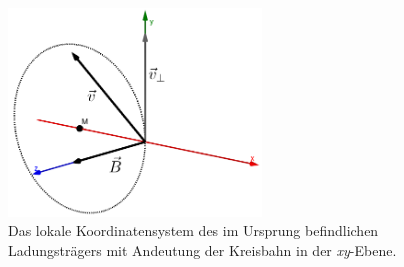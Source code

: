 \begin{figure}
  \centering
  \includegraphics[width=0.6\textwidth]{geogebra/img/local_movement_edited}
  \caption{Das lokale Koordinatensystem des im Ursprung befindlichen Ladungstr\"agers mit Andeutung der Kreisbahn in der
    \textit{xy}-Ebene.}
  \label{fig:locale_movement}
\end{figure}

